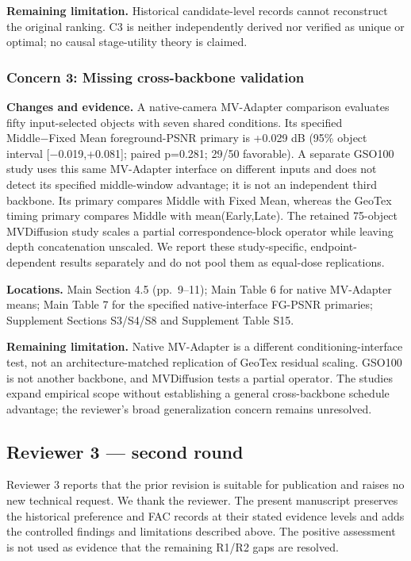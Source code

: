 \documentclass[
  10pt,
]{article}
\begin{document}
\textbf{Remaining limitation.} Historical candidate-level records cannot
reconstruct the original ranking. C3 is neither independently derived
nor verified as unique or optimal; no causal stage-utility theory is
claimed.

\hypertarget{concern-3-missing-cross-backbone-validation}{%
\subsubsection{Concern 3: Missing cross-backbone
validation}\label{concern-3-missing-cross-backbone-validation}}

\textbf{Changes and evidence.} A native-camera MV-Adapter comparison
evaluates fifty input-selected objects with seven shared conditions. Its
specified Middle−Fixed Mean foreground-PSNR primary is +0.029 dB (95\%
object interval {[}−0.019,+0.081{]}; paired p=0.281; 29/50 favorable). A
separate GSO100 study uses this same MV-Adapter interface on different
inputs and does not detect its specified middle-window advantage; it is
not an independent third backbone. Its primary compares Middle with
Fixed Mean, whereas the GeoTex timing primary compares Middle with
mean(Early,Late). The retained 75-object MVDiffusion study scales a
partial correspondence-block operator while leaving depth concatenation
unscaled. We report these study-specific, endpoint-dependent results
separately and do not pool them as equal-dose replications.

\textbf{Locations.} Main Section 4.5 (pp.~9--11); Main Table 6 for
native MV-Adapter means; Main Table 7 for the specified native-interface
FG-PSNR primaries; Supplement Sections S3/S4/S8 and Supplement Table
S15.

\textbf{Remaining limitation.} Native MV-Adapter is a different
conditioning-interface test, not an architecture-matched replication of
GeoTex residual scaling. GSO100 is not another backbone, and MVDiffusion
tests a partial operator. The studies expand empirical scope without
establishing a general cross-backbone schedule advantage; the reviewer's
broad generalization concern remains unresolved.

\hypertarget{reviewer-3-second-round}{%
\subsection{Reviewer 3 --- second round}\label{reviewer-3-second-round}}

Reviewer 3 reports that the prior revision is suitable for publication
and raises no new technical request. We thank the reviewer. The present
manuscript preserves the historical preference and FAC records at their
stated evidence levels and adds the controlled findings and limitations
described above. The positive assessment is not used as evidence that
the remaining R1/R2 gaps are resolved.
\end{document}
